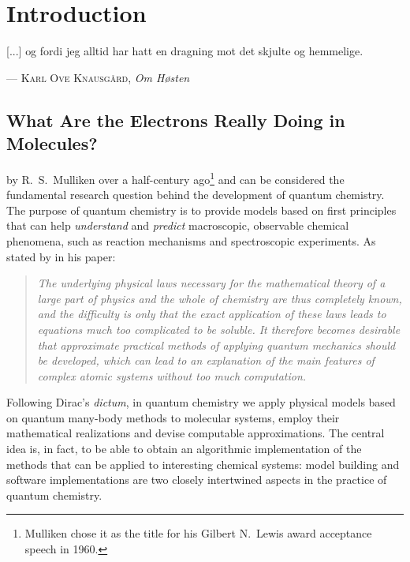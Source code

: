 {}

\chapter*{Introduction}

\epigraph{
[...] \textnorsk{og fordi jeg alltid har hatt en dragning mot det skjulte og hemmelige.}
}{
--- \textnorsk{\textsc{Karl Ove Knausgård}, \textit{Om Høsten}}
}

\renewcommand{\thefigure}{\Alph{figure}}

\section*{What Are the Electrons Really Doing in Molecules?}

 by R.~S.~Mulliken over a half-century
ago\footnote{Mulliken chose it as the title for his Gilbert N.~Lewis
award acceptance speech in 1960.}
and can be considered the fundamental research question behind the
development of quantum chemistry.
The purpose of quantum chemistry is to provide models based on first
principles that can help \emph{understand} and \emph{predict}
macroscopic, observable chemical phenomena, such as reaction mechanisms and
spectroscopic experiments.\autocite{Kovac2011-ew}
As stated by \citeauthor{Dirac1929-gn} in his 
paper:\autocite{Dirac1929-gn, Kutzelnigg2000-fl}
\blockquote{\small\textit{The underlying physical laws necessary for the mathematical
theory of a large part of physics and the whole of chemistry are thus
completely known, and the difficulty is only that the exact application of
these laws leads to equations much too complicated to be soluble. It
therefore becomes desirable that approximate practical methods of
applying quantum mechanics should be developed, which can lead to an
explanation of the main features of complex atomic systems without too
much computation.}}
Following Dirac's \emph{dictum}, in quantum chemistry we apply physical
models based on quantum many-body methods to molecular systems, employ
their mathematical realizations and devise computable approximations.
The central idea is, in fact, to be able to obtain an algorithmic
implementation of the methods that can be applied to interesting
chemical systems: model building and software implementations are two
closely intertwined aspects in the practice of quantum
chemistry.\autocite{Winsberg2010-sy}

